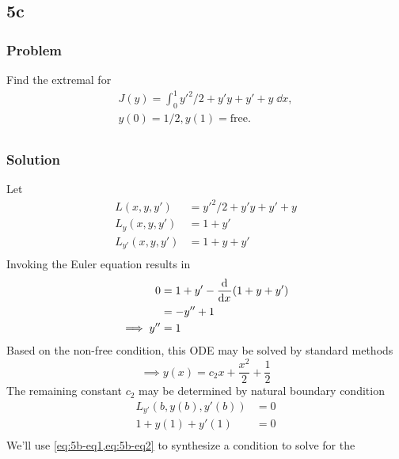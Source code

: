 \documentclass[12pt,twoside]{article}
\begin{document}
\subsection{5c}
\subsubsection*{Problem}
Find the extremal for
\begin{equation}
  \label{eq:5b-problem}
  \begin{aligned}
    J(y) = \int_0^1 y'^2/2+y'y+y'+y\;\dd{x}, \\
    y(0)=1/2, y(1)=\text{free}. \\
  \end{aligned}
\end{equation}

\subsubsection*{Solution}
Let
\begin{align*}
  L(x,y,y') &= y'^2/2+y'y+y'+y \\
  L_y(x,y,y') &= 1 + y' \\
  L_{y'}(x,y,y') &= 1 + y + y' \\
\end{align*}
Invoking the Euler equation results in
\begin{equation}
\label{eq:5b-ode}
\begin{aligned}
  0 &= 1 + y' - \frac{\mathrm{d}^{} {}}{\mathrm{d}{x}^{}}(1 + y + y') \\
  &= -y''+1 \\
  \implies y'' &= 1 \\
\end{aligned}
\end{equation}
Based on the non-free condition, this ODE may be solved by standard methods
\begin{equation}
  \label{eq:5b-eq1}
  \implies y(x) = c_2 x+\frac{x^2}{2}+\frac{1}{2}
\end{equation}
The remaining constant $c_2$ may be determined by natural boundary condition
\begin{equation}
  \label{eq:5b-eq2}
  \begin{aligned}
    L_{y'}(b,y(b),y'(b)) &= 0 \\
    1 + y(1) + y'(1) &= 0 \\
  \end{aligned}
\end{equation}
We'll use \cref{eq:5b-eq1,eq:5b-eq2} to synthesize a condition to solve for the
\end{document}
